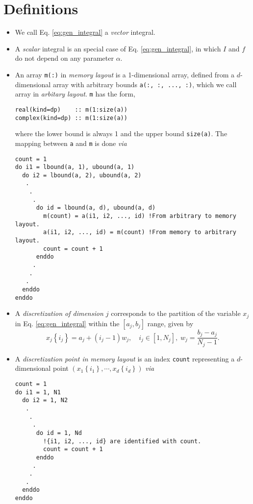 \documentclass[12pt,a4paper]{article}
\begin{document}
\section{Definitions}
\begin{itemize}
\item We call Eq. \eqref{eq:gen_integral} a \textit{vector} integral.
\item A \textit{scalar} integral is an special case of Eq. \eqref{eq:gen_integral}, in which $I$ and $f$ do not depend on any parameter $\alpha$.
\item An array {\tt m(:)} in \textit{memory layout} is a 1-dimensional array, defined from a $d$-dimensional array with arbitrary bounds {\tt a(:, :, ..., :)}, which we call array in \textit{arbitary layout}. {\tt m} has the form,
\begin{verbatim}
real(kind=dp)    :: m(1:size(a))
complex(kind=dp) :: m(1:size(a))
\end{verbatim}
where the lower bound is always 1 and the upper bound {\tt size(a)}. The mapping between {\tt a} and {\tt m} is done \textit{via}
\begin{verbatim}
count = 1
do i1 = lbound(a, 1), ubound(a, 1)
  do i2 = lbound(a, 2), ubound(a, 2)
   .
    .
     .
      do id = lbound(a, d), ubound(a, d)
        m(count) = a(i1, i2, ..., id) !From arbitrary to memory layout.
        a(i1, i2, ..., id) = m(count) !From memory to arbitrary layout.
        count = count + 1
      enddo
     .
    .
   .
  enddo
enddo
\end{verbatim}
\item A \textit{discretization of dimension $j$} corresponds to the partition of the variable $x_j$ in Eq. \eqref{eq:gen_integral} within the $[a_j, b_j]$ range, given by
\begin{equation}\label{eq:discretization}
x_j\left\lbrace i_j\right\rbrace = a_j + \left(i_j - 1 \right)w_j,\quad i_j\in [1, N_j],\; w_j = \frac{b_j - a_j}{N_j - 1}.
\end{equation}
\item A \textit{discretization point in memory layout} is an index {\tt count} representing a $d$-dimensional point $\left(x_1\left\lbrace i_1\right\rbrace, \cdots, x_d\left\lbrace i_d\right\rbrace \right)$ \textit{via}
\begin{verbatim}
count = 1
do i1 = 1, N1
  do i2 = 1, N2
   .
    .
     .
      do id = 1, Nd
        !{i1, i2, ..., id} are identified with count.
        count = count + 1
      enddo
     .
    .
   .
  enddo
enddo
\end{verbatim}
\end{itemize}
\end{document}

